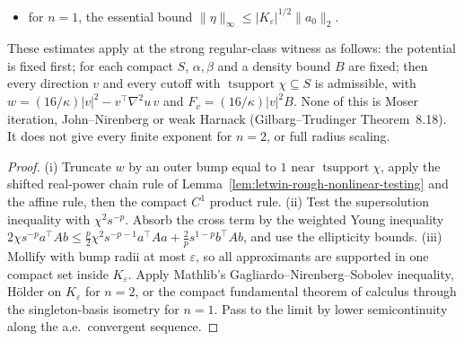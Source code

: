 \begin{lemma}
\begin{itemize}
      $\|\eta\|_6\le C_{\mathrm{GNS}}(3/2)\,|K_\varepsilon|^{1/6}\sum_i\|a_i\|_2$, where $K_\varepsilon$ is the closed
      $\varepsilon$-thickening;
    \item for $n=1$, the essential bound $\|\eta\|_\infty\le|K_\varepsilon|^{1/2}\|a_0\|_2$.
  \end{itemize}
  These estimates apply at the strong regular-class witness as follows: the potential is fixed first; for each compact $S$, $\alpha,\beta$
  and a density bound $B$ are fixed; then every direction $v$ and every cutoff with $\operatorname{tsupport}\chi\subseteq S$ is admissible,
  with $w=(16/\kappa)|v|^2-v^{\top}\nabla^2u\,v$ and $F_v=(16/\kappa)|v|^2B$.
  None of this is Moser iteration, John--Nirenberg or weak Harnack (Gilbarg--Trudinger Theorem~8.18). It does not give
  every finite exponent for $n=2$, or full radius scaling.
\end{lemma}
\begin{proof}
  \leanok
  (i) Truncate $w$ by an outer bump equal to $1$ near $\operatorname{tsupport}\chi$, apply the shifted real-power chain
  rule of Lemma~\ref{lem:letwin-rough-nonlinear-testing} and the affine rule, then the compact $C^1$ product rule.
  (ii) Test the supersolution inequality with $\chi^2 s^{-p}$. Absorb the cross term by the weighted Young inequality
  $2\chi s^{-p}a^{\top}Ab\le\frac p2\chi^2 s^{-p-1}a^{\top}Aa+\frac2p s^{1-p}b^{\top}Ab$, and use the ellipticity bounds.
  (iii) Mollify with bump radii at most $\varepsilon$, so all approximants are supported in one compact set inside
  $K_\varepsilon$. Apply Mathlib's Gagliardo--Nirenberg--Sobolev inequality, H\"older on $K_\varepsilon$ for $n=2$, or the
  compact fundamental theorem of calculus through the singleton-basis isometry for $n=1$. Pass to the limit by lower
  semicontinuity along the a.e.\ convergent sequence.
\end{proof}

